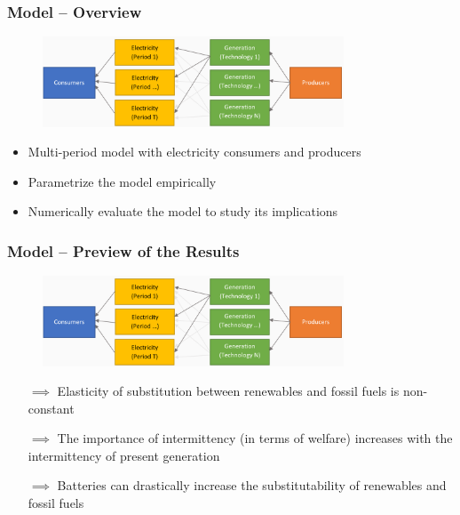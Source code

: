 \documentclass[aspectratio=169]{beamer}
\begin{document}
	
	
	
	\begin{frame}
		\frametitle{Model -- Overview}
		
		
		\begin{figure}
			\includegraphics[width=0.8\textwidth]{../figures/model_diagram.png} 
		\end{figure}
		
		\vspace{-1em}
		
		\begin{itemize}
			\setlength\itemsep{0.2em}
			\item Multi-period model with electricity consumers and producers
			\item Parametrize the model empirically
			\item Numerically evaluate the model to study its implications
		\end{itemize}
		
	\end{frame}
	
	
	
	\begin{frame}
		\frametitle{Model -- Preview of the Results}
		
		
		\begin{figure}
			\includegraphics[width=0.8\textwidth]{../figures/model_diagram.png} 
		\end{figure}
		
		\vspace{-0.8em}
		
		\begin{itemize}
			\setlength\itemsep{0.2em}
			\item[$\implies$] Elasticity of substitution between renewables and fossil fuels is non-constant
			\item[$\implies$] The importance of intermittency (in terms of welfare) increases with the intermittency of present generation
			\item[$\implies$] Batteries can drastically increase the substitutability of renewables and fossil fuels
		\end{itemize}
		
	\end{frame}
	
\end{document}
